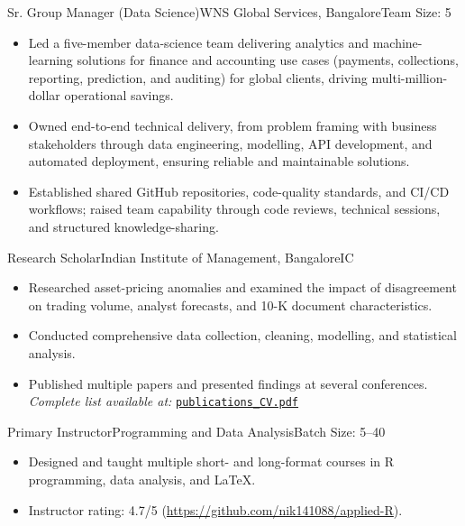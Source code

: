 \documentclass[11pt,a4paper]{moderncv}
\begin{document}
    {Sr. Group Manager (Data Science)}{WNS Global Services, Bangalore}{}{Team Size: 5}{
    \begin{itemize}
        \item Led a five-member data-science team delivering analytics and machine-learning solutions for finance and accounting use cases (payments, collections, reporting, prediction, and auditing) for global clients, driving multi-million-dollar operational savings.
        \item Owned end-to-end technical delivery, from problem framing with business stakeholders through data engineering, modelling, API development, and automated deployment, ensuring reliable and maintainable solutions.
        \item Established shared GitHub repositories, code-quality standards, and CI/CD workflows; raised team capability through code reviews, technical sessions, and structured knowledge-sharing.
    \end{itemize}
    }

    {Research Scholar}{Indian Institute of Management, Bangalore}{}{IC}{
    \begin{itemize}
        \item Researched asset-pricing anomalies and examined the impact of disagreement on trading volume, analyst forecasts, and 10-K document characteristics.
        \item Conducted comprehensive data collection, cleaning, modelling, and statistical analysis.
        \item Published multiple papers and presented findings at several conferences. \textit{Complete list available at:}
\href{https://github.com/nik141088/CV/blob/main/publications_CV.pdf}{\texttt{publications\_CV.pdf}}
    \end{itemize}
    }

    {Primary Instructor}{Programming and Data Analysis}{}{Batch Size: 5--40}{
    \begin{itemize}
        \item Designed and taught multiple short- and long-format courses in R programming, data analysis, and LaTeX.
        \item Instructor rating: 4.7/5 (\href{https://github.com/nik141088/applied-R}{https://github.com/nik141088/applied-R}).
    \end{itemize}
    }
\end{document}

